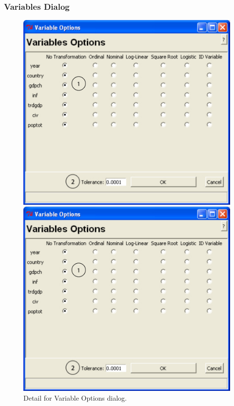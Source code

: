 \documentclass[12pt,titlepage]{article}
\begin{document}
\subsubsection{Variables Dialog}
\label{sec:vardiag}
\begin{figure}[ht]
  \centering 
  \begin{htmlonly} 
    \includegraphics[scale=1]{varopts} 
  \end{htmlonly}
  \begin{latexonly}
    \includegraphics[scale=.75]{varopts}
  \end{latexonly}
  \caption{Detail for Variable Options dialog.}
\end{figure}
\end{document}
